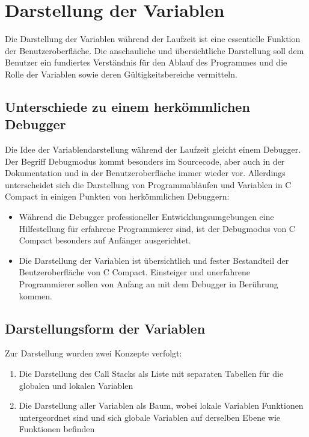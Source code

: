 \chapter{Darstellung der Variablen}

Die Darstellung der Variablen während der Laufzeit ist eine essentielle Funktion der Benutzeroberfläche. Die anschauliche und übersichtliche Darstellung soll dem Benutzer ein fundiertes Verständnis für den Ablauf des Programmes und die Rolle der Variablen sowie deren Gültigkeitsbereiche vermitteln.

\section{Unterschiede zu einem herkömmlichen Debugger}
Die Idee der Variablendarstellung während der Laufzeit gleicht einem Debugger. Der Begriff Debugmodus kommt besonders im Sourcecode, aber auch in der Dokumentation und in der Benutzeroberfläche immer wieder vor. Allerdings unterscheidet sich die Darstellung von Programmabläufen und Variablen in C Compact in einigen Punkten von herkömmlichen Debuggern:
\begin{itemize}
\item Während die Debugger professioneller Entwicklungsumgebungen eine Hilfestellung für erfahrene Programmierer sind, ist der Debugmodus von C Compact besonders auf Anfänger ausgerichtet.
\item Die Darstellung der Variablen ist übersichtlich und fester Bestandteil der Beutzeroberfläche von C Compact. Einsteiger und unerfahrene Programmierer sollen von Anfang an mit dem Debugger in Berührung kommen.
\end{itemize}

\section{Darstellungsform der Variablen}

Zur Darstellung wurden zwei Konzepte verfolgt:
\begin{enumerate}
\item Die Darstellung des Call Stacks als Liste mit separaten Tabellen für die globalen und lokalen Variablen
\item Die Darstellung aller Variablen als Baum, wobei lokale Variablen Funktionen untergeordnet sind und sich globale Variablen auf derselben Ebene wie Funktionen befinden
\end{enumerate}

